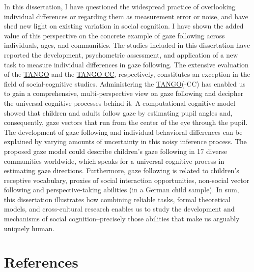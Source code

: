 \documentclass[
]{scrbook}
\begin{document}
In this dissertation, I have questioned the widespread practice of overlooking individual differences or regarding them as measurement error or noise, and have shed new light on existing variation in social cognition. I have shown the added value of this perspective on the concrete example of gaze following across individuals, ages, and communities. The studies included in this dissertation have reported the development, psychometric assessment, and application of a new task to measure individual differences in gaze following. The extensive evaluation of the \hyperref[acronyms_TANGO]{TANGO} and the \hyperref[acronyms_TANGO-CC]{TANGO-CC}, respectively, constitutes an exception in the field of social-cognitive studies. Administering the \hyperref[acronyms_TANGO]{TANGO}(-CC) has enabled us to gain a comprehensive, multi-perspective view on gaze following and decipher the universal cognitive processes behind it. A computational cognitive model showed that children and adults follow gaze by estimating pupil angles and, consequently, gaze vectors that run from the center of the eye through the pupil. The development of gaze following and individual behavioral differences can be explained by varying amounts of uncertainty in this noisy inference process. The proposed gaze model could describe children's gaze following in 17 diverse communities worldwide, which speaks for a universal cognitive process in estimating gaze directions. Furthermore, gaze following is related to children's receptive vocabulary, proxies of social interaction opportunities, non-social vector following and perspective-taking abilities (in a German child sample). In sum, this dissertation illustrates how combining reliable tasks, formal theoretical models, and cross-cultural research enables us to study the development and mechanisms of social cognition\thinspace --\thinspace precisely those abilities that make us arguably uniquely human.

\backmatter

\chapter{References}\label{references}
\end{document}
